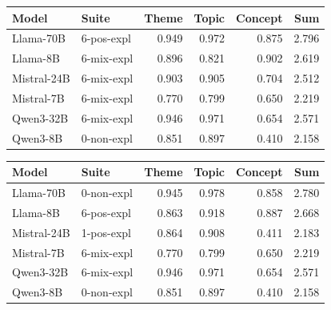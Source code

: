 \begin{table}
    \centering
    \tiny
    
    \begin{tabular}{llrrrr}
    \toprule
    Model & Suite & \bfseries Theme & Topic & Concept & Sum \\
    \midrule
    Llama-70B & 6-pos-expl & 0.949 & 0.972 & 0.875 & 2.796 \\
    Llama-8B & 6-mix-expl & 0.896 & 0.821 & 0.902 & 2.619 \\
    Mistral-24B & 6-mix-expl & 0.903 & 0.905 & 0.704 & 2.512 \\
    Mistral-7B & 6-mix-expl & 0.770 & 0.799 & 0.650 & 2.219 \\
    Qwen3-32B & 6-mix-expl & 0.946 & 0.971 & 0.654 & 2.571 \\
    Qwen3-8B & 0-non-expl & 0.851 & 0.897 & 0.410 & 2.158 \\
    \bottomrule
    \end{tabular}
    \quad
    \begin{tabular}{llrrrr}
    \toprule
    Model & Suite & Theme & \bfseries Topic & Concept & Sum \\
    \midrule
    Llama-70B & 0-non-expl & 0.945 & 0.978 & 0.858 & 2.780 \\
    Llama-8B & 6-pos-expl & 0.863 & 0.918 & 0.887 & 2.668 \\
    Mistral-24B & 1-pos-expl & 0.864 & 0.908 & 0.411 & 2.183 \\
    Mistral-7B & 6-mix-expl & 0.770 & 0.799 & 0.650 & 2.219 \\
    Qwen3-32B & 6-mix-expl & 0.946 & 0.971 & 0.654 & 2.571 \\
    Qwen3-8B & 0-non-expl & 0.851 & 0.897 & 0.410 & 2.158 \\
    \bottomrule
    \end{tabular}

    \quad
    

\end{table}
